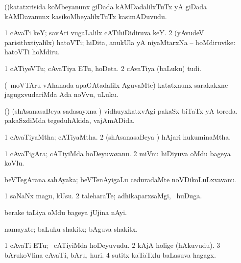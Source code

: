 \bentry
{} 
\gl{\nA}
\expl{}
\bmng
(\toV)katatxrisida koMbeyanunx giDada kAMDadalilxTuTx yA giDada kAMDavanunx kasikoMbeyalilxTuTx kasimADuvudu. 
\emng
\eentry

\bentry
{} 
\gl{\nA}
\expl{}
\bmng
\bnum
\num{1} cAvaTi keY; savAri \mo vugaLalilx cATihiDidiruva keY. 
\num{2} (yAvudeV parisithxtiyalilx) hatoVTi; hiDita, anukUla yA niyaMtarxNa -- hoMdiruvike:  hatoVTi hoMdiru. 
\enum
\emng
\eentry

\bentry
{} 
\gl{\nA}
\expl{}
\bmng
\bnum
\num{1} cATiyeVTu; cAvaTiya ETu, hoDeta. 
\num{2} cAvaTiya (baLuku) tudi. 
\enum
\emng
\eentry

\bentry
{} 
\gl{\nA}
\expl{}
\bmng
(\kanmu\ moVTAru vAhanada apaGAtadalilx AguvaMte) katatxnunx sarakakxne jagugxvudariMda Ada noVvu, uLuku. 
\emng
\eentry

\bentry
{} 
\gl{\gu}
\expl{}
\bmng
(\birx) (shAsanasaBeya sadasayxna \vi) 
\banum
{} vidhuyxkatxvAgi pakaSx biTaTx yA toreda. 
 pakaSxdiMda tegeduhAkida, vajAmADida. 
\eanum
\emng
\eentry

\bentry
{} 
\gl{\gu}
\expl{}
\bmng
\bnum
\num{1} cAvaTiyaMtha; cATiyaMtha. 
\num{2} (shAsanasaBeya \vi) hAjari hukuminaMtha. 
\enum
\emng
\eentry

\bentry
{} 
\gl{\nA}
\expl{}
\bmng
\bnum
\num{1} cAvaTigAra; cATiyiMda hoDeyuvavanu. 
\num{2} miVnu hiDiyuva oMdu bageya koVlu. 
\enum
\emng
\eentry

\bentry
{} 
\gl{\nA}
\expl{}
\bmng
beVTegArana sahAyaka; beVTenAyigaLu ceduradaMte noVDikoLuLxvavanu. 
\emng
\eentry

\bentry
{} 
\gl{\nA}
\expl{}
\bmng
\bnum
\num{1} saNaNx magu, kUsu. 
\num{2} taleharaTe; adhikaparxsaMgi, \kanmu\ huDuga. 
\enum
\emng
\eentry

\bentry
{} 
\gl{\nA}
\expl{}
\bmng
berake taLiya oMdu bageya jUjina nAyi. 
\emng
\eentry

\bentry
{} 
\gl{\nA}
\expl{}
\bmng
namayxte; baLuku shakitx; bAguva shakitx. 
\emng
\eentry

\bentry
{} 
\gl{\nA}
\expl{}
\bmng
\bnum
\num{1} cAvaTi ETu; \kanmu\ cATiyiMda hoDeyuvudu. 
\num{2} kAjA holige (hAkuvudu). 
\num{3} bArukoVlina cAvaTi, bAru, huri. 
\num{4} sutitx kaTaTxlu baLasuva hagagx. 
\enum
\emng
\eentry

